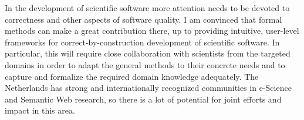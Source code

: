 \documentclass[sigplan,10pt,noacm]{acmart}
\begin{document}
In the development of scientific software more attention needs to be devoted to correctness and other aspects of software quality. I am convinced that formal methods can make a great contribution there, up to providing intuitive, user-level frameworks for correct-by-construction development of scientific software. In particular, this will require close collaboration with scientists from the targeted domains in order to adapt the general methods to their concrete needs and to capture and formalize the required domain knowledge adequately.
The Netherlands has strong and internationally recognized communities in e-Science and Semantic Web research, so there is a lot of potential for joint efforts and impact in this area. 



\end{document}
